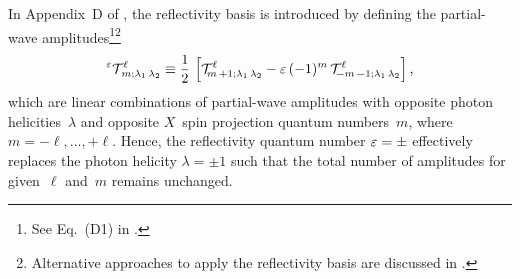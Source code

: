 In Appendix~D of , the reflectivity basis is
introduced by defining the partial-wave amplitudes\footnote{See
Eq.~(D1) in .}\footnote{Alternative
approaches to apply the reflectivity basis are discussed in
.}
\begin{equation}
  \label{eq:photoprod_amplitude_refl}
  \prescript{\refl}{}{\mathcal{T}}^\ell_{\!m; \lambda_1\, \lambda_2}
  \equiv \frac{1}{2}\, \sBrk{\mathcal{T}^\ell_{\!m\, {+1}; \lambda_1\, \lambda_2}
  - \refl\, (-1)^m\, \mathcal{T}^\ell_{\!{-m}\, {-1}; \lambda_1\, \lambda_2}},
\end{equation}
which are linear combinations of partial-wave amplitudes with opposite
photon helicities~$\lambda$ and opposite $X$~spin projection quantum
numbers~$m$, where $m = -\ell, \ldots, +\ell$.  Hence, the
reflectivity quantum number $\varepsilon = \pm$ effectively replaces the
photon helicity $\lambda = \pm 1$ such that the total number of
amplitudes for given~$\ell$ and~$m$ remains unchanged.


